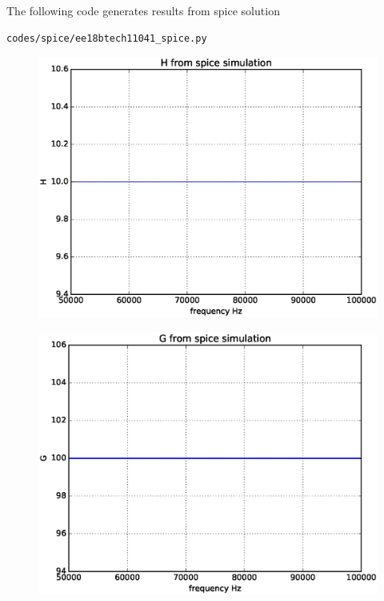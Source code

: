 \begin{enumerate}[label=\arabic*.,ref=\theenumi]
The following code generates results from spice solution

\begin{lstlisting}
codes/spice/ee18btech11041_spice.py
\end{lstlisting}

\begin{figure}[!ht]
\centering
\includegraphics[width=\columnwidth]{./figs/H1.eps}
\caption{}
\label{fig:fig7}
\end{figure}


\begin{figure}[!ht]
\centering
\includegraphics[width=\columnwidth]{./figs/G1.eps}
\caption{}
\label{fig:fig8}
\end{figure}



\end{enumerate}
